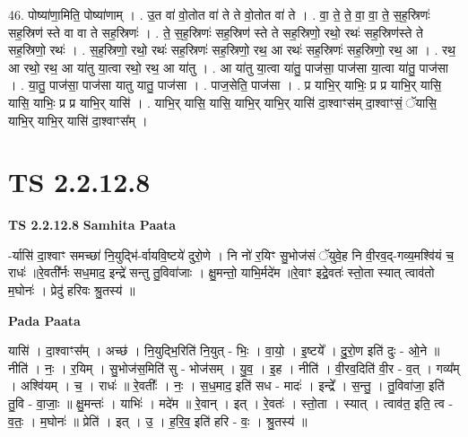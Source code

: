 \documentclass[17pt]{extarticle}
\begin{document}
46. पोष्या॑णा॒मिति॒ पोष्या॑णाम् । . उ॒त वा॑ वो॒तोत वा॑ ते ते वो॒तोत वा॑ ते । . वा॒ ते॒ ते॒ वा॒ वा॒ ते॒ स॒ह॒स्रिणः॑ सह॒स्रिण॑ स्ते वा वा ते सह॒स्रिणः॑ । . ते॒ स॒ह॒स्रिणः॑ सह॒स्रिण॑ स्ते ते सह॒स्रिणो॒ रथो॒ रथः॑ सह॒स्रिण॑स्ते ते सह॒स्रिणो॒ रथः॑ । . स॒ह॒स्रिणो॒ रथो॒ रथः॑ सह॒स्रिणः॑ सह॒स्रिणो॒ रथ॒ आ रथः॑ सह॒स्रिणः॑ सह॒स्रिणो॒ रथ॒ आ । . रथ॒ आ रथो॒ रथ॒ आ या॑तु या॒त्वा रथो॒ रथ॒ आ या॑तु । . आ या॑तु या॒त्वा या॑तु॒ पाज॑सा॒ पाज॑सा या॒त्वा या॑तु॒ पाज॑सा । . या॒तु॒ पाज॑सा॒ पाज॑सा यातु यातु॒ पाज॑सा । . पाज॒सेति॒ पाज॑सा । . प्र याभि॒र् याभिः॒ प्र प्र याभि॒र् यासि॒ यासि॒ याभिः॒ प्र प्र याभि॒र् यासि॑ । . याभि॒र् यासि॒ यासि॒ याभि॒र् याभि॒र् यासि॑ दा॒श्वाꣳस॑म् दा॒श्वाꣳसं॒ ॅयासि॒ याभि॒र् याभि॒र् यासि॑ दा॒श्वाꣳस᳚म् । \newline
\pagebreak
{}
\section*{ TS 2.2.12.8 }

\textbf{TS 2.2.12.8 } \newline
\textbf{Samhita Paata} \newline

-र्यासि॑ दा॒श्वाꣳ समच्छा॑ नि॒युद्भि॑-र्वायवि॒ष्टये॑ दुरो॒णे । नि नो॑ र॒यिꣳ सु॒भोज॑सं ॅयुवे॒ह नि वी॒रव॒द्-गव्य॒मश्वि॑यं च॒ राधः॑ ॥रे॒वती᳚र्नः सध॒माद॒ इन्द्रे॑ सन्तु तु॒विवा॑जाः । क्षु॒मन्तो॒ याभि॒र्मदे॑म ॥रे॒वाꣳ इद्रे॒वतः॑ स्तो॒ता स्यात् त्वाव॑तो म॒घोनः॑ । प्रेदु॑ हरिवः श्रु॒तस्य॑ ॥ \newline

\textbf{Pada Paata} \newline

यासि॑ । दा॒श्वाꣳस᳚म् । अच्छ॑ । नि॒युद्भि॒रिति॑ नि॒युत् - भिः॒ । वा॒यो॒ । इ॒ष्टये᳚ । दु॒रो॒ण इति॑ दुः - ओ॒ने ॥ नीति॑ । नः॒ । र॒यिम् । सु॒भोज॑स॒मिति॑ सु - भोज॑सम् । यु॒व॒ । इ॒ह । नीति॑ । वी॒रव॒दिति॑ वी॒र - व॒त् । गव्य᳚म् । अश्वि॑यम् । च॒ । राधः॑ ॥ रे॒वतीः᳚ । नः॒ । स॒ध॒माद॒ इति॑ सध - मादः॑ । इन्द्रे᳚ । स॒न्तु॒ । तु॒विवा॑जा॒ इति॑ तु॒वि - वा॒जाः॒ ॥ क्षु॒मन्तः॑ । याभिः॑ । मदे॑म ॥ रे॒वान् । इत् । रे॒वतः॑ । स्तो॒ता । स्यात् । त्वाव॑त॒ इति॒ त्व - व॒तः॒ । म॒घोनः॑ ॥ प्रेति॑ । इत् । उ॒ । ह॒रि॒व॒ इति॑ हरि - वः॒ । श्रु॒तस्य॑ ॥  \newline
\end{document}
